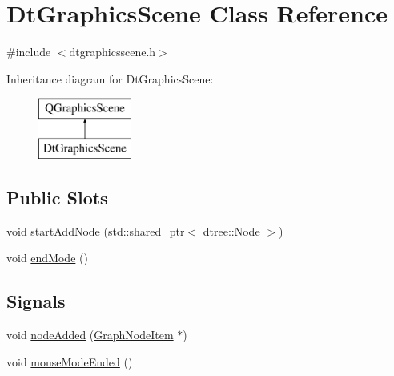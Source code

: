 \hypertarget{class_dt_graphics_scene}{}\section{Dt\+Graphics\+Scene Class Reference}
\label{class_dt_graphics_scene}


{\ttfamily \#include $<$dtgraphicsscene.\+h$>$}

Inheritance diagram for Dt\+Graphics\+Scene\+:\begin{figure}[H]
\begin{center}
\leavevmode
\includegraphics[height=2.000000cm]{d1/d7b/class_dt_graphics_scene}
\end{center}
\end{figure}
\subsection*{Public Slots}
\begin{DoxyCompactItemize}
\item 
void \mbox{\hyperlink{class_dt_graphics_scene_ad5ebd850cf2cfd9b79230ea34ac7f9b3}{start\+Add\+Node}} (std\+::shared\+\_\+ptr$<$ \mbox{\hyperlink{classdtree_1_1_node}{dtree\+::\+Node}} $>$)
\item 
void \mbox{\hyperlink{class_dt_graphics_scene_ae61bf9979e8470d74d08d0fea8dac739}{end\+Mode}} ()
\end{DoxyCompactItemize}
\subsection*{Signals}
\begin{DoxyCompactItemize}
\item 
void \mbox{\hyperlink{class_dt_graphics_scene_a977a724dee6c2a1f89853dc3506440f0}{node\+Added}} (\mbox{\hyperlink{class_graph_node_item}{Graph\+Node\+Item}} $\ast$)
\item 
void \mbox{\hyperlink{class_dt_graphics_scene_a050d0c4a0b8516314f42ab4b5f3e0606}{mouse\+Mode\+Ended}} ()
\end{DoxyCompactItemize}
